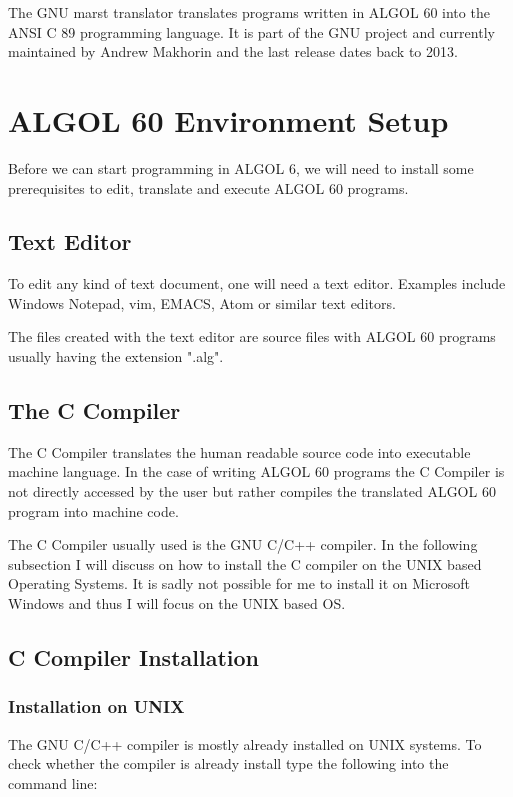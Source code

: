 \documentclass{article}
\begin{document}
The GNU marst translator translates programs written in ALGOL 60 into the ANSI C 89 programming language. It is part of the GNU project and currently maintained by Andrew Makhorin and the last release dates back to 2013.

\section{ALGOL 60 Environment Setup}
Before we can start programming in ALGOL 6, we will need to install some prerequisites to edit, translate and execute ALGOL 60 programs.

\subsection{Text Editor}
To edit any kind of text document, one will need a text editor. Examples include Windows Notepad, vim, EMACS, Atom or similar text editors. 

The files created with the text editor are source files with ALGOL 60 programs usually having the extension ".alg".

\subsection{The C Compiler}
The C Compiler translates the human readable source code into executable machine language. In the case of writing ALGOL 60 programs the C Compiler is not directly accessed by the user but rather compiles the translated ALGOL 60 program into machine code. 

The C Compiler usually used is the GNU C/C++ compiler. In the following subsection I will discuss on how to install the C compiler on the UNIX based Operating Systems. It is sadly not possible for me to install it on Microsoft Windows and thus I will focus on the UNIX based OS.

\subsection{C Compiler Installation}

\subsubsection{Installation on UNIX}
The GNU C/C++ compiler is mostly already installed on UNIX systems. To check whether the compiler is already install type the following into the command line:
\end{document}

